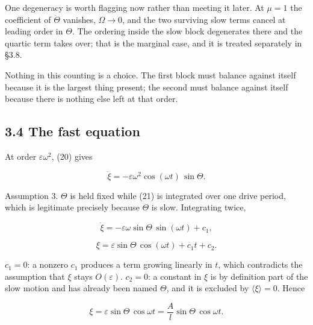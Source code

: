 \documentclass[11pt,a4paper]{article}
\newcommand{\tagmark}[1]{\marginnote{\scriptsize\ttfamily #1}}
\newcommand{\Dtag}{\tagmark{[D]}}   %
\newcommand{\Atag}{\tagmark{[A]}}   %
\begin{document}
\Dtag{} One degeneracy is worth flagging now rather than meeting it later. At
\(\mu=1\) the coefficient of \(\ddot\Theta\) vanishes, \(\Omega\to0\), and the two
surviving slow terms cancel at leading order in \(\Theta\). The ordering inside
the slow block degenerates there and the quartic term takes over; that is the
marginal case, and it is treated separately in §3.8.

Nothing in this counting is a choice. The first block must balance against
itself because it is the largest thing present; the second must balance against
itself because there is nothing else left at that order.

\hypertarget{the-fast-equation}{%
\subsection{3.4 The fast equation}\label{the-fast-equation}}

At order \(\varepsilon\omega^2\), (20) gives

\begin{equation}
\ddot\xi = -\varepsilon\omega^2\cos(\omega t)\,\sin\Theta. \tag{21}
\end{equation}

\Atag{} Assumption 3. \(\Theta\) is held fixed while (21) is integrated over one
drive period, which is legitimate precisely because \(\Theta\) is slow. Integrating
twice,

\begin{equation}
\dot\xi = -\varepsilon\omega\sin\Theta\,\sin(\omega t) + c_1, \tag{22}
\end{equation}

\begin{equation}
\xi = \varepsilon\sin\Theta\,\cos(\omega t) + c_1 t + c_2. \tag{23}
\end{equation}

\Dtag{} \(c_1=0\): a nonzero \(c_1\) produces a term growing linearly in \(t\), which
contradicts the assumption that \(\xi\) stays \(O(\varepsilon)\). \(c_2=0\): a
constant in \(\xi\) is by definition part of the slow motion and has already been
named \(\Theta\), and it is excluded by \(\langle\xi\rangle=0\). Hence

\begin{equation}
\xi = \varepsilon\sin\Theta\,\cos\omega t
      = \frac{A}{l}\sin\Theta\,\cos\omega t. \tag{24}
\end{equation}
\end{document}
